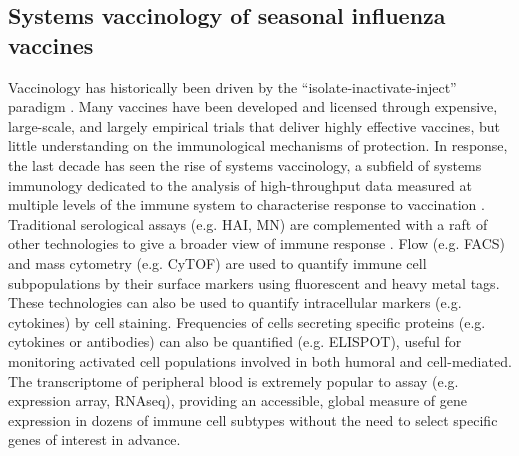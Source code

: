 \subsection{Systems vaccinology of seasonal influenza vaccines}
\label{subsec:hird_dge_intro_systemsVaccFlu}

Vaccinology has historically been driven by the \enquote{isolate-inactivate-inject} paradigm \autocite{degregorio2014EmpiricismRationalDesign}.
Many vaccines have been developed and licensed through expensive, large-scale, and largely empirical trials that deliver highly effective vaccines, 
but little understanding on the immunological mechanisms of protection.
In response, the last decade has seen the rise of systems vaccinology, 
a subfield of systems immunology dedicated to the analysis of high-throughput data measured at multiple levels of the immune system to characterise response to vaccination
\autocite{pulendran2010SystemsVaccinology,nakaya2012SystemsVaccinologyLearning,li2013SystemsBiologicalApproaches,pulendran2014SystemsVaccinologyProbing,hagan2015SystemsVaccinologyEnabling,nakaya2015VaccinologyEraHighthroughput,davis2018WillSystemsBiology,raeven2019SystemsVaccinologyBig}.
Traditional serological assays (e.g. \gls{HAI}, \gls{MN}) are complemented with a raft of other technologies to give a broader view of immune response \autocite{nakaya2012SystemsVaccinologyLearning,li2013SystemsBiologicalApproaches,pulendran2014SystemsVaccinologyProbing,davis2018WillSystemsBiology,raeven2019SystemsVaccinologyBig}.
Flow (e.g. \gls{FACS}) and mass cytometry (e.g. \gls{CyTOF}) are used to quantify immune cell subpopulations by their surface markers using fluorescent and heavy metal tags.
These technologies can also be used to quantify intracellular markers (e.g. cytokines) by cell staining.
Frequencies of cells secreting specific proteins (e.g. cytokines or antibodies) can also be quantified (e.g. \gls{ELISPOT}), useful for monitoring activated cell populations involved in both humoral and cell-mediated.
The transcriptome of peripheral blood is extremely popular to assay (e.g. expression array, \gls{RNAseq}), 
providing an accessible, global measure of gene expression in dozens of immune cell subtypes without the need to select specific genes of interest in advance.
